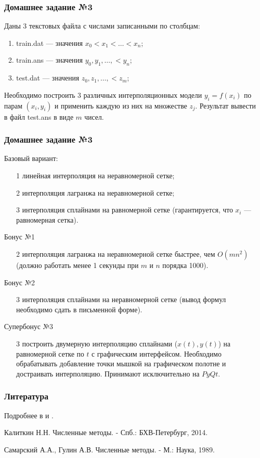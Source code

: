 \documentclass[10pt]{beamer}
\begin{document}
\begin{frame}[fragile]
\frametitle{Домашнее задание №3}

Даны 3 текстовых файла с числами записанными по столбцам:
\begin{enumerate}
\item train.dat --- значения $x_0 < x_1 < \ldots < x_n$;
\item train.ans --- значения $y_0, y_1, \ldots, < y_n$;
\item test.dat --- значения $z_0, z_1, \ldots, < z_m$;
\end{enumerate}

Необходимо построить 3 различных интерполяционных модели $y_i = f(x_i)$ по парам $(x_i, y_i)$ и применить каждую из них на множестве $z_j$. Результат вывести в файл test.ans в виде $m$ чисел.
\end{frame}


\begin{frame}[fragile]
\frametitle{Домашнее задание №3}
Базовый вариант:
\begin{enumerate}
\item[1] линейная интерполяция на неравномерной сетке;
\item[2] интерполяция лагранжа на неравномерной сетке;
\item[3] интерполяция сплайнами на равномерной сетке (гарантируется, что $x_i$ --- равномерная сетка).
\end{enumerate}

Бонус №1
\begin{enumerate}
\item[2] интерполяция лагранжа на неравномерной сетке быстрее, чем $O(mn^2)$ (должно работать менее 1 секунды при $m$ и $n$ порядка 1000).
\end{enumerate}

Бонус №2
\begin{enumerate}
\item[3] интерполяция сплайнами на неравномерной сетке (вывод формул необходимо сдать в письменной форме).
\end{enumerate}

Супербонус №3
\begin{enumerate}
\item[3] построить двумерную интерполяцию сплайнами ($x(t), y(t)$) на равномерной сетке по $t$ с графическим интерфейсом. Необходимо обрабатывать добавление точки мышкой на графическом полотне и достраивать интерполяцию. Принимают исключительно на $PyQt$.
\end{enumerate}
\end{frame}

\begin{frame}[fragile]
\frametitle{Литература}
Подробнее в \cite[стр. 44]{Kalitkin} и \cite[стр. 65]{Samarsky}.



\begin{thebibliography}{99}

Калиткин Н.Н. Численные методы. - Спб.: БХВ-Петербург, 2014.

Самарский А.А., Гулин А.В. Численные методы. - М.: Наука, 1989.

\end{thebibliography}
\end{frame}
\end{document}
